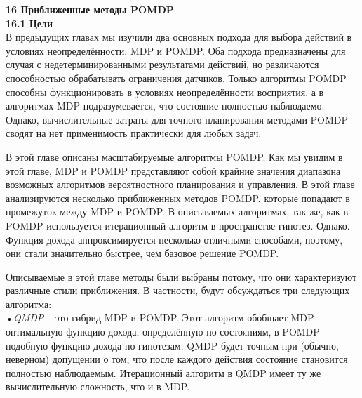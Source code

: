 \documentclass[10pt,a4paper]{article}
\begin{document}
\textbf{16	Приближенные методы POMDP} \\

\textbf{16.1	Цели}\\

В предыдущих главах мы изучили два основных подхода для выбора действий в условиях неопределённости: MDP и POMDP. Оба подхода предназначены для случая с недетерминированными результатами действий, но различаются способностью обрабатывать ограничения датчиков. Только алгоритмы POMDP способны функционировать в условиях неопределённости восприятия, а в алгоритмах MDP подразумевается, что состояние полностью наблюдаемо. Однако, вычислительные затраты для точного планирования методами POMDP сводят на нет применимость практически для любых задач.

В этой главе описаны масштабируемые алгоритмы POMDP. Как мы увидим в этой главе, MDP и POMDP представляют собой крайние значения диапазона возможных алгоритмов вероятностного планирования и управления. В этой главе анализируются несколько приближенных методов POMDP, которые попадают в промежуток между MDP и POMDP. В описываемых алгоритмах, так же, как в POMDP используется итерационный алгоритм в пространстве гипотез. Однако. Функция дохода аппроксимируется несколько отличными способами, поэтому, они стали значительно быстрее, чем базовое решение POMDP.

Описываемые в этой главе методы были выбраны потому, что они характеризуют различные стили приближения. В частности, будут обсуждаться три следующих алгоритма:\\

•\textit{QMDP} – это гибрид MDP и POMDP. Этот алгоритм обобщает MDP-оптимальную функцию дохода, определённую по состояниям, в POMDP-подобную функцию дохода по гипотезам. QMDP будет точным при (обычно, неверном) допущении о том, что после каждого действия состояние становится полностью наблюдаемым. Итерационный алгоритм в QMDP имеет ту же вычислительную сложность, что и в MDP. 
\end{document}
